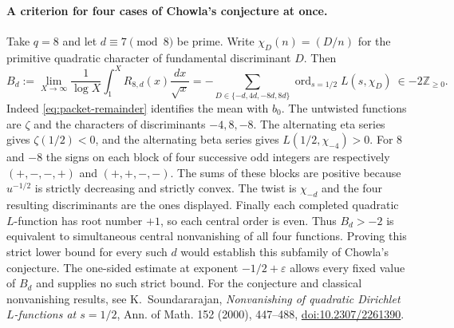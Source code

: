 \paragraph{A criterion for four cases of Chowla's conjecture at once.}
Take $q=8$ and let $d\equiv7\pmod8$ be prime. Write
$\chi_D(n)=(D/n)$ for the primitive quadratic character of fundamental
discriminant $D$. Then
\[
 B_d:=\lim_{X\to\infty}\frac1{\log X}
       \int_1^X R_{8,d}(x)\frac{dx}{\sqrt{x}}
   =-\sum_{D\in\{-d,4d,-8d,8d\}}
       \operatorname{ord}_{s=1/2} L(s,\chi_D)\ \in -2\mathbb Z_{\ge0}.
\]
Indeed \eqref{eq:packet-remainder} identifies the mean with $b_0$.
The untwisted functions are $\zeta$ and the characters of discriminants
$-4,8,-8$. The alternating eta series gives $\zeta(1/2)<0$, and the
alternating beta series gives $L(1/2,\chi_{-4})>0$. For $8$ and $-8$
the signs on each block of four successive odd integers are respectively
$(+,-,-,+)$ and $(+,+,-,-)$. The sums of these blocks are positive because
$u^{-1/2}$ is strictly decreasing and strictly convex. The twist is
$\chi_{-d}$ and the four resulting discriminants are the ones displayed.
Finally each completed quadratic $L$-function has root number $+1$, so
each central order is even. Thus $B_d>-2$ is equivalent to
simultaneous central nonvanishing of all four functions. Proving this
strict lower bound for every such $d$ would establish this subfamily of
Chowla's conjecture. The one-sided estimate at exponent $-1/2+\varepsilon$
allows every fixed value of $B_d$ and supplies no such strict bound.
For the conjecture and classical nonvanishing results, see K.~Soundararajan,
\emph{Nonvanishing of quadratic Dirichlet $L$-functions at $s=1/2$},
Ann. of Math. 152 (2000), 447--488,
\href{https://doi.org/10.2307/2261390}{doi:10.2307/2261390}.
